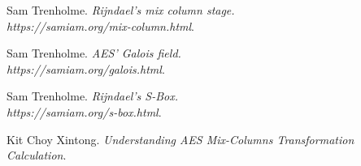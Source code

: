 \documentclass[a4paper, 10pt]{article}
\begin{document}
\begin{multicols}{2}
\begin{thebibliography}{3}
            Sam Trenholme.
            \textit{Rijndael's mix column stage.\\https://samiam.org/mix-column.html}.

            Sam Trenholme.
            \textit{AES' Galois field.\\https://samiam.org/galois.html}.

            Sam Trenholme.
            \textit{Rijndael's S-Box.\\https://samiam.org/s-box.html}.

            Kit Choy Xintong.
            \textit{Understanding AES Mix-Columns Transformation Calculation}.
        \end{thebibliography}

    \end{multicols}
\end{document}
